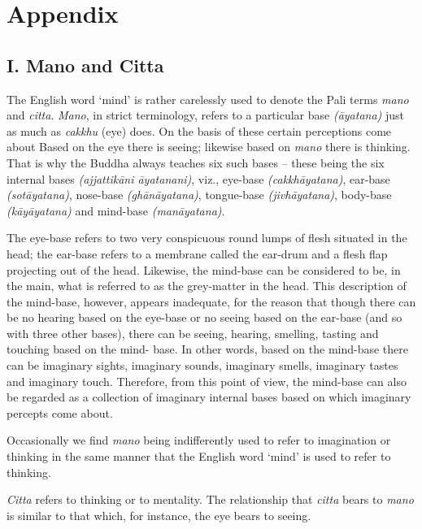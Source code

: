 \chapter{Appendix}

\hypertarget{_i_mano_and_citta}{%
\section{I. Mano and Citta}\label{_i_mano_and_citta}}

 The English word `mind' is rather carelessly used to denote the Pali terms \emph{mano} and \emph{citta}. \emph{Mano}, in strict terminology, refers to a particular base \emph{(āyatana)} just as much as \emph{cakkhu} (eye) does. On the basis of these certain perceptions come about Based on the eye there is seeing; likewise based on \emph{mano} there is thinking. That is why the Buddha always teaches six such bases -- these being the six internal bases \emph{(ajjattikāni āyatanani)}, viz., eye-base \emph{(cakkhāyatana)}, ear-base \emph{(sotāyatana)}, nose-base \emph{(ghānāyatana)}, tongue-base \emph{(jivhāyatana)}, body-base \emph{(kāyāyatana)} and mind-base \emph{(manāyatana)}.

The eye-base refers to two very conspicuous round lumps of flesh situated in the head; the ear-base refers to a membrane called the ear-drum and a flesh flap projecting out of the head. Likewise, the mind-base can be considered to be, in the main, what is referred to as the grey-matter in the head. This description of the mind-base, however, appears inadequate, for the reason that though there can be no hearing based on the eye-base or no seeing based on the ear-base (and so with three other bases), there can be seeing, hearing, smelling, tasting and touching based on the mind- base. In other words, based on the mind-base there can be imaginary sights, imaginary sounds, imaginary smells, imaginary tastes and imaginary touch. Therefore, from this point of view, the mind-base can also be regarded as a collection of imaginary internal bases based on which imaginary percepts come about.

Occasionally we find \emph{mano} being indifferently used to refer to imagination or thinking in the same manner that the English word `mind' is used to refer to thinking.

 \emph{Citta} refers to thinking or to mentality. The relationship that \emph{citta} bears to \emph{mano} is similar to that which, for instance, the eye bears to seeing.

